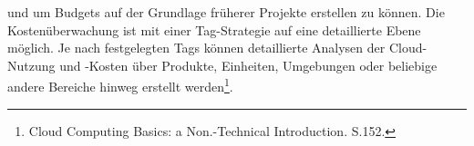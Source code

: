 und um Budgets auf der Grundlage früherer Projekte erstellen zu können. Die Kostenüberwachung ist mit einer Tag-Strategie auf eine detaillierte Ebene möglich. Je nach festgelegten Tags können detaillierte Analysen der Cloud-Nutzung und -Kosten über Produkte, Einheiten, Umgebungen oder beliebige andere Bereiche hinweg erstellt werden\footnote{Cloud Computing Basics: a Non.-Technical Introduction. S.152.\cite{CCB}}.

